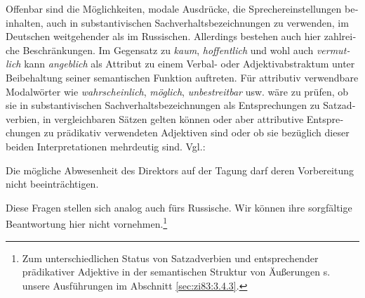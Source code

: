 \documentclass[output=paper]{langscibook}
\begin{document}
\begin{otherlanguage}{german}


    


    

\noindent Offenbar sind die Möglichkeiten, modale Ausdrücke, die Sprechereinstellungen beinhalten, auch in substantivischen Sachverhaltsbezeichnungen zu verwenden, im Deutschen weitgehender als im Russischen. Allerdings bestehen auch hier zahlreiche Beschränkungen. Im Gegensatz zu \textit{kaum}, \textit{hoffentlich} und wohl auch \textit{vermutlich} kann \textit{angeblich} als Attribut zu einem Verbal- oder Adjektivabstraktum unter Beibehaltung seiner semantischen Funktion auftreten. Für attributiv verwendbare Modalwörter wie \textit{wahrscheinlich}, \textit{möglich}, \textit{unbestreitbar} usw. wäre zu prüfen, ob sie in substantivischen Sachverhaltsbezeichnungen als Entsprechungen zu Satzadverbien, in vergleichbaren Sätzen gelten können oder aber attributive Entsprechungen zu prädikativ verwendeten Adjektiven sind oder ob sie be\-züg\-lich dieser beiden Interpretationen mehrdeutig sind. Vgl.:

\ea \label{ex:zi83:20} Die mögliche Abwesenheit des Direktors auf der Tagung darf deren Vorbereitung nicht beeinträchtigen.
\z

\newpage
\noindent Diese Fragen stellen sich analog auch fürs Russische. Wir können ihre sorgfältige Beantwortung hier nicht vornehmen.\footnote{Zum unterschiedlichen Status von Satzadverbien und entsprechender prädikativer Adjektive in der semantischen Struktur von Äußerungen s. unsere Ausführungen im Abschnitt \ref{sec:zi83:3.4.3}.} 


\end{otherlanguage}
\end{document}
